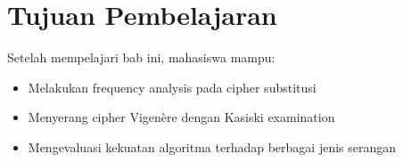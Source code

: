 \section*{Tujuan Pembelajaran}
Setelah mempelajari bab ini, mahasiswa mampu:
\begin{itemize}
\item Melakukan frequency analysis pada cipher substitusi
\item Menyerang cipher Vigenère dengan Kasiski examination
\item Mengevaluasi kekuatan algoritma terhadap berbagai jenis serangan
\end{itemize}
